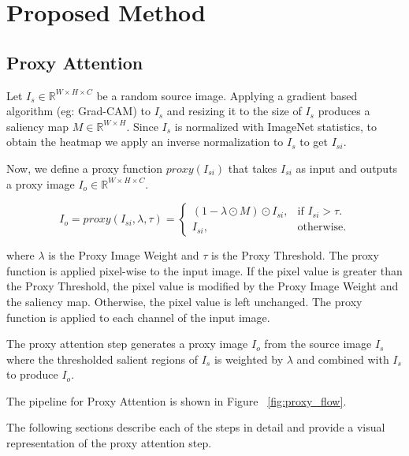 \chapter{Proposed Method} \label{ch:implementation}
\section{Proxy Attention}
Let $I_{s} \in \mathbb{R}^{W \times H \times C}$ be a random source image. 
Applying a gradient based algorithm (eg: Grad-CAM) to $I_{s}$ and resizing it to the size of $I_{s}$ produces a saliency map $M \in \mathbb{R}^{W \times H}$. 
Since $I_{s}$ is normalized with ImageNet statistics, to obtain the heatmap we apply an inverse normalization to $I_{s}$ to get $I_{si}$.

Now, we define a proxy function $proxy(I_{si})$ that takes $I_{si}$ as input and outputs a proxy image $I_{o} \in \mathbb{R}^{W \times H \times C}$.

\begin{equation}
    I_{o} = proxy(I_{si}, \lambda, \tau)=\begin{cases}
        (1- \lambda \odot M) \odot I_{si}, & \text{if $I_{si}> \tau$}.\\
        I_{si}, & \text{otherwise}.
    \end{cases}
\end{equation}

where $\lambda$ is the Proxy Image Weight and $\tau$ is the Proxy Threshold. The proxy function is applied pixel-wise to the input image. If the pixel value is greater than the Proxy Threshold, the pixel value is modified by the Proxy Image Weight and the saliency map. Otherwise, the pixel value is left unchanged. The proxy function is applied to each channel of the input image. 

The proxy attention step generates a proxy image $I_{o}$ from the source image $I_{s}$ where the thresholded salient regions of $I_{s}$ is weighted by $\lambda$ and combined with $I_{s}$ to produce $I_{o}$.

The pipeline for Proxy Attention is shown in Figure ~\ref{fig:proxy_flow}.

The following sections describe each of the steps in detail and provide a visual representation of the proxy attention step.

